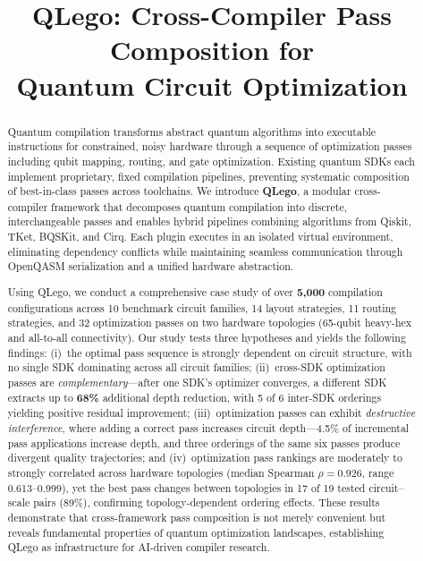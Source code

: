 \documentclass[conference]{IEEEtran}
\begin{document}
\title{QLego: Cross-Compiler Pass Composition for\\Quantum Circuit Optimization}

\author{
}

\maketitle

\begin{abstract}
Quantum compilation transforms abstract quantum algorithms into executable instructions for constrained, noisy hardware through a sequence of optimization passes including qubit mapping, routing, and gate optimization.
Existing quantum SDKs each implement proprietary, fixed compilation pipelines, preventing systematic composition of best-in-class passes across toolchains.
We introduce \textbf{QLego}, a modular cross-compiler framework that decomposes quantum compilation into discrete, interchangeable passes and enables hybrid pipelines combining algorithms from Qiskit, TKet, BQSKit, and Cirq.
Each plugin executes in an isolated virtual environment, eliminating dependency conflicts while maintaining seamless communication through OpenQASM serialization and a unified hardware abstraction.

Using QLego, we conduct a comprehensive case study of over \textbf{5,000} compilation configurations across 10 benchmark circuit families, 14 layout strategies, 11 routing strategies, and 32 optimization passes on two hardware topologies (65-qubit heavy-hex and all-to-all connectivity).
Our study tests three hypotheses and yields the following findings:
(i)~the optimal pass sequence is strongly dependent on circuit structure, with no single SDK dominating across all circuit families;
(ii)~cross-SDK optimization passes are \textit{complementary}---after one SDK's optimizer converges, a different SDK extracts up to \textbf{68\%} additional depth reduction, with 5 of 6 inter-SDK orderings yielding positive residual improvement;
(iii)~optimization passes can exhibit \textit{destructive interference}, where adding a correct pass increases circuit depth---4.5\% of incremental pass applications increase depth, and three orderings of the same six passes produce divergent quality trajectories;
and (iv)~optimization pass rankings are moderately to strongly correlated across hardware topologies (median Spearman $\rho = 0.926$, range 0.613--0.999), yet the best pass changes between topologies in 17 of 19 tested circuit--scale pairs (89\%), confirming topology-dependent ordering effects.
These results demonstrate that cross-framework pass composition is not merely convenient but reveals fundamental properties of quantum optimization landscapes, establishing QLego as infrastructure for AI-driven compiler research.


\end{abstract}
\end{document}
